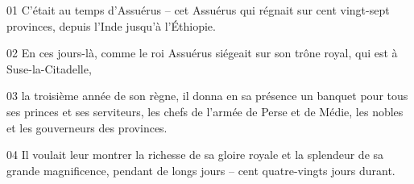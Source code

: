 01 C’était au temps d’Assuérus – cet Assuérus qui régnait sur cent vingt-sept provinces, depuis l’Inde jusqu’à l’Éthiopie.

02 En ces jours-là, comme le roi Assuérus siégeait sur son trône royal, qui est à Suse-la-Citadelle,

03 la troisième année de son règne, il donna en sa présence un banquet pour tous ses princes et ses serviteurs, les chefs de l’armée de Perse et de Médie, les nobles et les gouverneurs des provinces.

04 Il voulait leur montrer la richesse de sa gloire royale et la splendeur de sa grande magnificence, pendant de longs jours – cent quatre-vingts jours durant.
